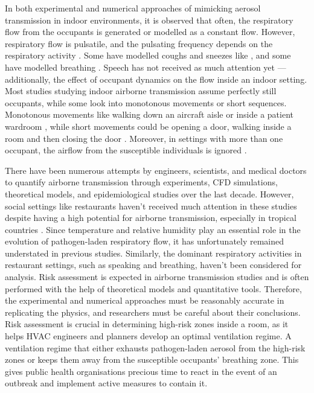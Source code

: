 \documentclass[a4paper,12pt]{elsarticle}
\begin{document}
In both experimental and numerical approaches of mimicking aerosol transmission in indoor environments, it is observed that often, the respiratory flow from the occupants is generated \cite{zhou2021experimental,romano2015numerical} or modelled  \cite{ren2021numerical,li2023numerical,wu2023numerical} as a constant flow. However, respiratory flow is pulsatile, and the pulsating frequency depends on the respiratory activity \cite{semple1983measurement,kelly2004modeling}. Some have modelled coughs and sneezes like \cite{mirzaie2021covid}, and some have modelled breathing \cite{he2011cfd,shao2021risk}. Speech has not received as much attention yet \cite{giri2022colliding,singhal2022virus}—additionally, the effect of occupant dynamics on the flow inside an indoor setting. Most studies studying indoor airborne transmission assume perfectly still occupants, while some look into monotonous movements or short sequences. Monotonous movements like walking down an aircraft aisle or inside a patient wardroom \cite{poussou2010flow,wu2023numerical}, while short movements could be opening a door, walking inside a room and then closing the door \cite{saarinen2015large}. Moreover, in settings with more than one occupant, the airflow from the susceptible individuals is ignored \cite{jain2023numerical}.

There have been numerous attempts by engineers, scientists, and medical doctors to quantify airborne transmission through experiments, CFD simulations, theoretical models, and epidemiological studies over the last decade. However, social settings like restaurants haven't received much attention in these studies despite having a high potential for airborne transmission, especially in tropical countries \cite{prata2020temperature}. Since temperature and relative humidity play an essential role in the evolution of pathogen-laden respiratory flow, it has unfortunately remained understated in previous studies. Similarly, the dominant respiratory activities in restaurant settings, such as speaking and breathing, haven't been considered for analysis. Risk assessment is expected in airborne transmission studies and is often performed with the help of theoretical models and quantitative tools. Therefore, the experimental and numerical approaches must be reasonably accurate in replicating the physics, and researchers must be careful about their conclusions. Risk assessment is crucial in determining high-risk zones inside a room, as it helps HVAC engineers and planners develop an optimal ventilation regime. A ventilation regime that either exhausts pathogen-laden aerosol from the high-risk zones or keeps them away from the susceptible occupants' breathing zone. This gives public health organisations precious time to react in the event of an outbreak and implement active measures to contain it.
\end{document}
